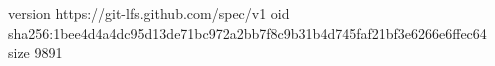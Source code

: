 version https://git-lfs.github.com/spec/v1
oid sha256:1bee4d4a4dc95d13de71bc972a2bb7f8c9b31b4d745faf21bf3e6266e6ffec64
size 9891
